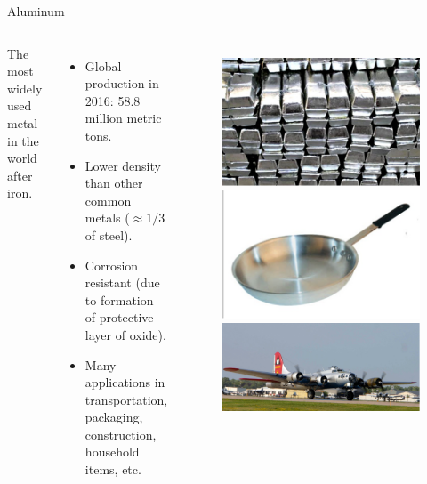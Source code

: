 \documentclass[aspectratio=169]{beamer}
\begin{document}
    \begin{frame}{Aluminum}
    \begin{columns}
    The most widely used metal in the world after iron.
    \begin{itemize}
        \item Global production in 2016: 58.8 million metric tons.
        \item Lower density than other common metals ($\approx 1/3$ of steel).
        \item Corrosion resistant (due to formation of protective layer of oxide).
        \item Many applications in transportation, packaging, construction, household items, etc.
    \end{itemize}

        \begin{figure}
            \centering
            \includegraphics[width=0.8\linewidth]{lectures/figures/Lab4_Al1.png}
            \includegraphics[width=0.8\linewidth]{lectures/figures/Lab4_Al2.png}
            \includegraphics[width=0.8\linewidth]{lectures/figures/Lab4_Al3.png}

\end{figure}
\end{columns}
\end{frame}
\end{document}
